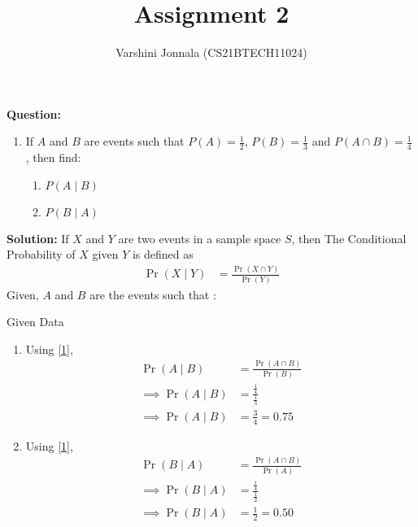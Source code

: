 \documentclass[journal,12pt,twocolumn]{IEEEtran}
\title{Assignment 2}
\author{Varshini Jonnala (CS21BTECH11024)}
\providecommand{\pr}[1]{\ensuremath{\Pr\left(#1\right)}}
\newcommand{\question}{\noindent \textbf{Question: }}
\newcommand{\solution}{\noindent \textbf{Solution: }}
\begin{document}
    \maketitle
    
    \question
    \begin{enumerate}[label=]
        \item  If $A$ and $B$ are events such that $P(A) = \frac{1}{2}$, $P(B)= \frac{1}{3}$ and $P(A \cap B)= \frac{1}{4}$ , then find:
    \begin{enumerate}
        \item $P(A \mid B)$
        \item $P(B \mid A)$
    \end{enumerate}
    \end{enumerate}

    \solution 
     If $X$ and $Y$ are two events in a sample space $S$, then The Conditional Probability of $X$ given $Y$ is defined as
        \begin{align}
        \label{1}  \pr{X \mid Y} &= \frac{\pr{X \cap Y}}{\pr{Y}}  
        \end{align}
        Given, $A$ and $B$ are the events such that :
        \begin{table}[ht!]
            
        \caption{Given Data}
	        \label{Tables:Table}
        \end{table}
    
        \begin{enumerate}
            \item Using \eqref{1},
            \begin{align}
                \pr{A \mid B} &= \frac{\pr{A \cap B}}{\pr{B}}\\
                \implies \pr{A \mid B} &= {\frac{\frac{1}{4}}{\frac{1}{3}}}\\
                \implies \pr{A \mid B} &= \frac{3}{4} = 0.75
            \end{align}
            
            \item Using \eqref{1},
                \begin{align}
                \pr{B \mid A} &= \frac{\pr{A \cap B}}{\pr{A}}\\
                \implies \pr{B \mid A} &= {\frac{\frac{1}{4}}{\frac{1}{2}}}\\
                \implies \pr{B \mid A} &= \frac{1}{2} = 0.50
            \end{align} 
        \end{enumerate}
    
\end{document}
